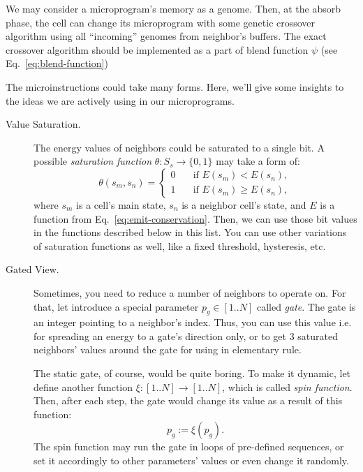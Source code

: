 \documentclass[a4paper,12pt,tikz,UTF8]{article}
\begin{document}
    We may consider a microprogram's memory as a genome. Then, at the absorb phase, the cell can change its microprogram with some genetic crossover algorithm using all ``incoming'' genomes from neighbor's buffers. The exact crossover algorithm should be implemented as a part of blend function $\psi$ (see Eq.~\ref{eq:blend-function})

    The microinstructions could take many forms. Here, we'll give some insights to the ideas we are actively using in our microprograms.
    \begin{description}
      \item [Value Saturation.] The energy values of neighbors could be saturated to a single bit. A possible \textit{saturation function} $\theta: S_s \to \{ 0, 1 \}$ may take a form of:
        \begin{equation}
          \theta(s_m, s_n) = 
          \begin{cases}
            0 \quad & \text{if } E(s_m) < E(s_n),\\
            1 \quad & \text{if } E(s_m) \geq E(s_n),
          \end{cases}
        \end{equation}
        where $s_m$ is a cell's main state, $s_n$ is a neighbor cell's state, and $E$ is a function from Eq.~\ref{eq:emit-conservation}. Then, we can use those bit values in the functions described below in this list. You can use other variations of saturation functions as well, like a fixed threshold, hysteresis, etc.
      \item [Gated View.] Sometimes, you need to reduce a number of neighbors to operate on. For that, let introduce a special parameter $p_g \in {[1 .. N]}$ called \textit{gate}. The gate is an integer pointing to a neighbor's index. Thus, you can use this value i.e. for spreading an energy to a gate's direction only, or to get 3 saturated neighbors' values around the gate for using in elementary rule.
        
        The static gate, of course, would be quite boring. To make it dynamic, let define another function $\xi: {[1 .. N]} \to {[1 .. N]}$, which is called \textit{spin function}. Then, after each step, the gate would change its value as a result of this function:
        \begin{equation}
          p_g := \xi(p_g).
        \end{equation}
        The spin function may run the gate in loops of pre-defined sequences, or set it accordingly to other parameters' values or even change it randomly.


\end{description}
\end{document}
